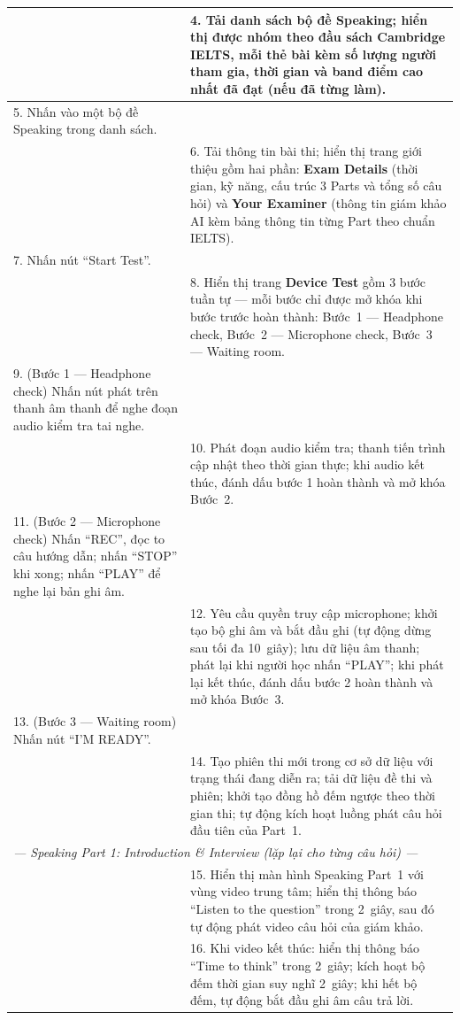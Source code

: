 \begin{longtable}{|p{\tbu}|p{\tbu}|}
    & 4. Tải danh sách bộ đề Speaking; hiển thị được nhóm theo đầu sách Cambridge IELTS, mỗi thẻ bài kèm số lượng người tham gia, thời gian và band điểm cao nhất đã đạt (nếu đã từng làm). \\ \hline
    5. Nhấn vào một bộ đề Speaking trong danh sách. & \\ \hline
    & 6. Tải thông tin bài thi; hiển thị trang giới thiệu gồm hai phần: \textbf{Exam Details} (thời gian, kỹ năng, cấu trúc 3 Parts và tổng số câu hỏi) và \textbf{Your Examiner} (thông tin giám khảo AI kèm bảng thông tin từng Part theo chuẩn IELTS). \\ \hline
    7. Nhấn nút ``Start Test''. & \\ \hline
    & 8. Hiển thị trang \textbf{Device Test} gồm 3 bước tuần tự --- mỗi bước chỉ được mở khóa khi bước trước hoàn thành: Bước~1 --- Headphone check, Bước~2 --- Microphone check, Bước~3 --- Waiting room. \\ \hline
    9. (Bước 1 --- Headphone check) Nhấn nút phát trên thanh âm thanh để nghe đoạn audio kiểm tra tai nghe. & \\ \hline
    & 10. Phát đoạn audio kiểm tra; thanh tiến trình cập nhật theo thời gian thực; khi audio kết thúc, đánh dấu bước 1 hoàn thành và mở khóa Bước~2. \\ \hline
    11. (Bước 2 --- Microphone check) Nhấn ``REC'', đọc to câu hướng dẫn; nhấn ``STOP'' khi xong; nhấn ``PLAY'' để nghe lại bản ghi âm. & \\ \hline
    & 12. Yêu cầu quyền truy cập microphone; khởi tạo bộ ghi âm và bắt đầu ghi (tự động dừng sau tối đa 10~giây); lưu dữ liệu âm thanh; phát lại khi người học nhấn ``PLAY''; khi phát lại kết thúc, đánh dấu bước 2 hoàn thành và mở khóa Bước~3. \\ \hline
    13. (Bước 3 --- Waiting room) Nhấn nút ``I'M READY''. & \\ \hline
    & 14. Tạo phiên thi mới trong cơ sở dữ liệu với trạng thái đang diễn ra; tải dữ liệu đề thi và phiên; khởi tạo đồng hồ đếm ngược theo thời gian thi; tự động kích hoạt luồng phát câu hỏi đầu tiên của Part~1. \\ \hline
    \multicolumn{2}{|l|}{\textit{--- Speaking Part 1: Introduction \& Interview (lặp lại cho từng câu hỏi) ---}} \\ \hline
    & 15. Hiển thị màn hình Speaking Part~1 với vùng video trung tâm; hiển thị thông báo ``Listen to the question'' trong 2~giây, sau đó tự động phát video câu hỏi của giám khảo. \\ \hline
    & 16. Khi video kết thúc: hiển thị thông báo ``Time to think'' trong 2~giây; kích hoạt bộ đếm thời gian suy nghĩ 2~giây; khi hết bộ đếm, tự động bắt đầu ghi âm câu trả lời. \\ \hline

\end{longtable}
